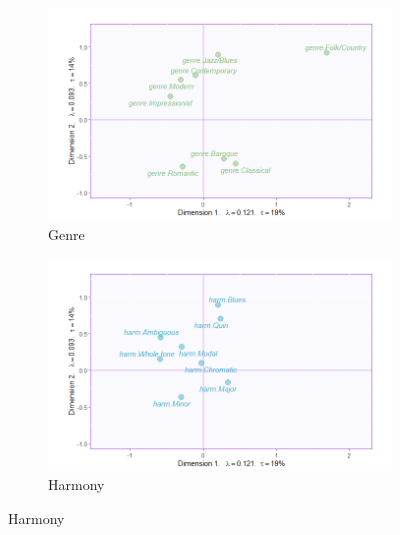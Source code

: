 \documentclass[
]{article}
\begin{document}
\begin{figure}[H]
\begin{subfigure}[b]{.45\linewidth}
\includegraphics[width=\linewidth]{./supmatsimgs/qjgenre.png}
\caption{Genre}\label{fig:genre}
\end{subfigure}
\begin{subfigure}[b]{.45\linewidth}
\includegraphics[width=\linewidth]{./supmatsimgs/qjharmony.png}
\caption{Harmony}\label{fig:harmony}
\end{subfigure}


\end{figure}
\end{document}

